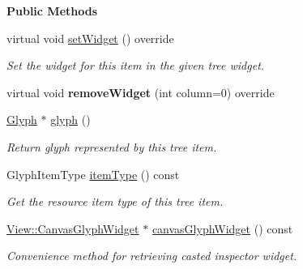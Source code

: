 \begin{Indent}\textbf{ Public Methods}\par
\begin{DoxyCompactItemize}
\item 
virtual void \mbox{\hyperlink{classrev_1_1_view_1_1_glyph_item_a0afc24f14c725056ad457f43881ea279}{set\+Widget}} () override
\begin{DoxyCompactList}\small\item\em Set the widget for this item in the given tree widget. \end{DoxyCompactList}\item 
\mbox{\label{classrev_1_1_view_1_1_glyph_item_a698b0f2c08bdf331131589c287b883c6}} 
virtual void {\bfseries remove\+Widget} (int column=0) override
\item 
\mbox{\label{classrev_1_1_view_1_1_glyph_item_a0d40db611729397860483a41a1c8d7b9}} 
\mbox{\hyperlink{classrev_1_1_glyph}{Glyph}} $\ast$ \mbox{\hyperlink{classrev_1_1_view_1_1_glyph_item_a0d40db611729397860483a41a1c8d7b9}{glyph}} ()
\begin{DoxyCompactList}\small\item\em Return glyph represented by this tree item. \end{DoxyCompactList}\item 
\mbox{\label{classrev_1_1_view_1_1_glyph_item_af155961a9570856af111ac2c2453d850}} 
Glyph\+Item\+Type \mbox{\hyperlink{classrev_1_1_view_1_1_glyph_item_af155961a9570856af111ac2c2453d850}{item\+Type}} () const
\begin{DoxyCompactList}\small\item\em Get the resource item type of this tree item. \end{DoxyCompactList}\item 
\mbox{\label{classrev_1_1_view_1_1_glyph_item_a045537727702af8c24043466a63f36b7}} 
\mbox{\hyperlink{classrev_1_1_view_1_1_canvas_glyph_widget}{View\+::\+Canvas\+Glyph\+Widget}} $\ast$ \mbox{\hyperlink{classrev_1_1_view_1_1_glyph_item_a045537727702af8c24043466a63f36b7}{canvas\+Glyph\+Widget}} () const
\begin{DoxyCompactList}\small\item\em Convenience method for retrieving casted inspector widget. \end{DoxyCompactList}\end{DoxyCompactItemize}
\end{Indent}
